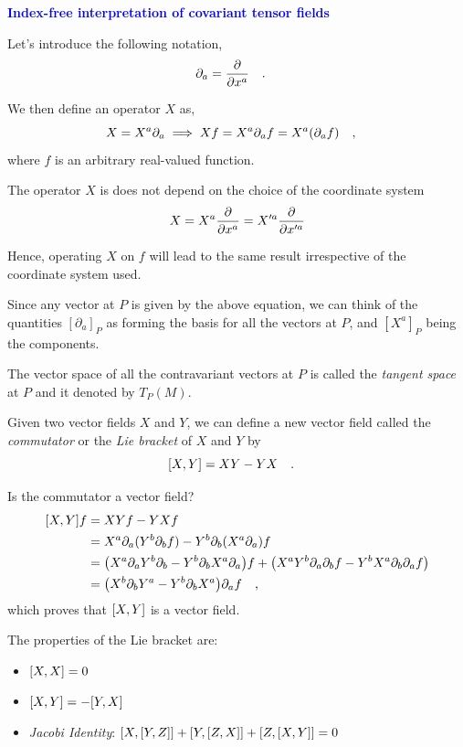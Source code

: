 \documentclass[landscape,aspectratio=169]{slides}
\begin{document}
\begin{slide}
	\textcolor{blue}{\textbf{Index-free interpretation of covariant tensor fields}}
	
	Let's introduce the following notation,
	\begin{equation}\label{key}
	\partial_a = \pdv{x^a} \qq{.}
	\end{equation}
	
	We then define an operator $ X $ as,
	\begin{equation}\label{key}
	X = X^a \partial_a \implies Xf = X^a \partial_a f = X^a (\partial_a f) \qq{,}
	\end{equation}
	where $ f $ is an arbitrary real-valued function. 
\end{slide}	

\begin{slide}
	The operator $ X $ is does not depend on the choice of the coordinate system $$ X = X^a \pdv{x^a} =X'^a \pdv{x'^a}  $$	
	
	Hence, operating $ X $ on $ f $ will lead to the same result irrespective of the coordinate system used.
	
	Since any vector at $ P $ is given by the above equation, we can think of the quantities $ [\partial_a]_P $ as forming the basis for all the vectors at $ P $, and $ [X^a]_P $ being the components.
	
	The vector space of all the contravariant vectors at $ P $ is called the \textit{tangent space} at $ P $ and it denoted by $T_P(M)$.
\end{slide}

\begin{slide}
	Given two vector fields $ X $ and $ Y $, we can define a new vector field called the \textit{commutator} or the \textit{Lie bracket} of $ X $ and $ Y $ by
	\begin{equation}\label{key}
	\qty[X, Y] = XY - YX \qq{.}
	\end{equation}
	
	Is the commutator a vector field?
	\begin{align*}
	\qty[X, Y] f &= XYf - YXf \\
	&= X^a \partial_a ( Y^b \partial_b f  ) - Y^b \partial_b (X^a \partial_a ) f \\
	&=\qty(X^a \partial_a Y^b \partial_b    - Y^b \partial_b X^a \partial_a ) f  + \qty(X^a Y^b \partial_a  \partial_b f - Y^b X^a \partial_b \partial_a f) \\
	& = \qty(X^b \partial_b Y^a     - Y^b \partial_b X^a ) \partial_a f \qq{,} 
	\end{align*}
	which proves that $ \qty[X,Y] $ is a vector field.
\end{slide}
\begin{slide}	
	The properties of the Lie bracket are:
	\begin{itemize}
		\item  $ \qty[X,X] = 0 $
		\item $ \comm{X}{Y} = - \comm{Y}{X} $
		\item \textit{Jacobi Identity}: $ \comm{X}{\comm{Y}{Z}} + \comm{Y}{\comm{Z}{X}} + \comm{Z}{\comm{X}{Y}} = 0 $
	\end{itemize}
\end{slide}
\end{document}
